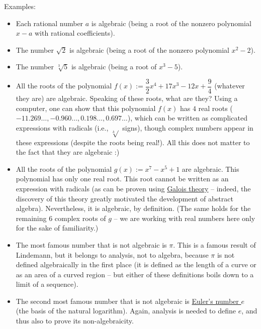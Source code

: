 \documentclass[numbers=enddot,12pt,final,onecolumn,notitlepage]{scrartcl}%
\numberwithin{exer}{section}
\theoremstyle{definition}
\begin{document}
Examples:

\begin{itemize}
\item Each rational number $a$ is algebraic (being a root of the nonzero
polynomial $x-a$ with rational coefficients).

\item The number $\sqrt{2}$ is algebraic (being a root of the nonzero
polynomial $x^{2}-2$).

\item The number $\sqrt[3]{5}$ is algebraic (being a root of $x^{3}-5$).

\item All the roots of the polynomial $f\left(  x \right)  := \dfrac{3}%
{2}x^{4}+17x^{3}-12x+\dfrac{9}{4}$ (whatever they are) are algebraic. \newline
Speaking of these roots, what are they? Using a computer, one can show that
this polynomial $f\left(  x \right)  $ has $4$ real roots ($-11.269\ldots,
-0.960\ldots, 0.198\ldots, 0.697\ldots$), which can be written as complicated
expressions with radicals (i.e., $\sqrt[k]{}$ signs), though complex numbers
appear in these expressions (despite the roots being real!). All this does not
matter to the fact that they are algebraic :)

\item All the roots of the polynomial $g\left(  x \right)  := x^{7} - x^{5} +
1$ are algebraic. \newline This polynomial has only one real root. This root
cannot be written as an expression with radicals (as can be proven using
\href{https://en.wikipedia.org/wiki/Galois_theory}{Galois theory} -- indeed,
the discovery of this theory greatly motivated the development of abstract
algebra).
Nevertheless, it is algebraic, by definition. (The same holds for the
remaining $6$ complex roots of $g$ -- we are working with real numbers here
only for the sake of familiarity.)

\item The most famous number that is not algebraic is $\pi$. This is a famous
result of Lindemann, but it belongs to analysis, not to algebra, because $\pi$
is not defined algebraically in the first place (it is defined as the length
of a curve or as an area of a curved region -- but either of these definitions
boils down to a limit of a sequence).

\item The second most famous number that is not algebraic is
\href{https://en.wikipedia.org/wiki/E_(mathematical_constant)}{Euler's number
$e$} (the basis of the natural logarithm). Again, analysis is needed to define
$e$, and thus also to prove its non-algebraicity.
\end{itemize}
\end{document}
